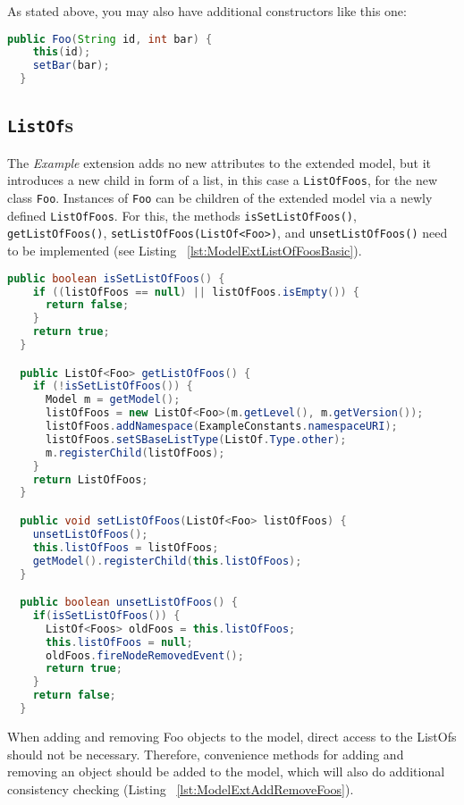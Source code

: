 As stated above, you may also have additional constructors like this one:
\begin{lstlisting}[language=Java,caption={Additional constructor for \texttt{Foo}},label={lst:ModelExtFooConstructorsAdditional}]
  public Foo(String id, int bar) {
    this(id);
    setBar(bar);
  }
\end{lstlisting}



\subsection{\texttt{ListOf}s}

The \emph{Example} extension adds no new attributes to the extended model,
but it introduces a new child in form of a list, in this case a \texttt{ListOfFoos},
for the new class \texttt{Foo}.
Instances of \texttt{Foo} can be children of the extended model via a newly defined \texttt{ListOfFoos}.
For this, the methods \texttt{isSetListOfFoos()}, \texttt{getListOfFoos()}, \texttt{setListOfFoos(ListOf<Foo>)}, and \texttt{unsetListOfFoos()} need to be implemented (see Listing ~\vref{lst:ModelExtListOfFoosBasic}).

\begin{lstlisting}[language=Java,caption={Implementation of the ListOf methods: \texttt{isSetListOfFoos()}, \texttt{getListOfFoos()}, \texttt{setListOfFoos()}},label={lst:ModelExtListOfFoosBasic}]
public boolean isSetListOfFoos() {
    if ((listOfFoos == null) || listOfFoos.isEmpty()) {
      return false;
    }
    return true;
  }

  public ListOf<Foo> getListOfFoos() {
    if (!isSetListOfFoos()) {
      Model m = getModel();
      listOfFoos = new ListOf<Foo>(m.getLevel(), m.getVersion());
      listOfFoos.addNamespace(ExampleConstants.namespaceURI);
      listOfFoos.setSBaseListType(ListOf.Type.other);
      m.registerChild(listOfFoos);
    }
    return ListOfFoos;
  }

  public void setListOfFoos(ListOf<Foo> listOfFoos) {
    unsetListOfFoos();
    this.listOfFoos = listOfFoos;
    getModel().registerChild(this.listOfFoos);
  }

  public boolean unsetListOfFoos() {
    if(isSetListOfFoos()) {
      ListOf<Foos> oldFoos = this.listOfFoos;
      this.listOfFoos = null;
      oldFoos.fireNodeRemovedEvent();
      return true;
    }
    return false;
  }
\end{lstlisting}

When adding and removing Foo objects to the model, direct access to the ListOfs should not be necessary.
Therefore, convenience methods for adding and removing an object should be added to the model, which will also do additional consistency checking (Listing ~\vref{lst:ModelExtAddRemoveFoos}).

